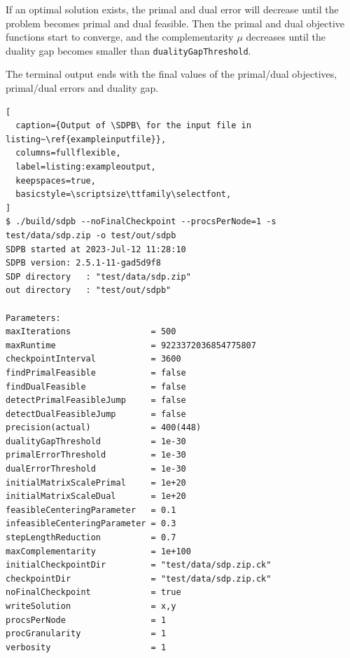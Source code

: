 \documentclass[12pt]{article}
\numberwithin{equation}{section}
\newcommand\SDPB{\texttt{SDPB}}
\begin{document}
If an optimal solution exists, the primal and dual error will decrease until the problem becomes primal and dual feasible.  Then the primal and dual objective functions start to converge, and the complementarity $\mu$ decreases until the duality gap becomes smaller than \texttt{dualityGapThreshold}.

The terminal output ends with the final values of the primal/dual objectives, primal/dual errors and duality gap.

\begin{lstlisting}[
  caption={Output of \SDPB\ for the input file in listing~\ref{exampleinputfile}},
  columns=fullflexible,
  label=listing:exampleoutput,
  keepspaces=true,
  basicstyle=\scriptsize\ttfamily\selectfont,
]
$ ./build/sdpb --noFinalCheckpoint --procsPerNode=1 -s test/data/sdp.zip -o test/out/sdpb
SDPB started at 2023-Jul-12 11:28:10
SDPB version: 2.5.1-11-gad5d9f8
SDP directory   : "test/data/sdp.zip"
out directory   : "test/out/sdpb"

Parameters:
maxIterations                = 500
maxRuntime                   = 9223372036854775807
checkpointInterval           = 3600
findPrimalFeasible           = false
findDualFeasible             = false
detectPrimalFeasibleJump     = false
detectDualFeasibleJump       = false
precision(actual)            = 400(448)
dualityGapThreshold          = 1e-30
primalErrorThreshold         = 1e-30
dualErrorThreshold           = 1e-30
initialMatrixScalePrimal     = 1e+20
initialMatrixScaleDual       = 1e+20
feasibleCenteringParameter   = 0.1
infeasibleCenteringParameter = 0.3
stepLengthReduction          = 0.7
maxComplementarity           = 1e+100
initialCheckpointDir         = "test/data/sdp.zip.ck"
checkpointDir                = "test/data/sdp.zip.ck"
noFinalCheckpoint            = true
writeSolution                = x,y
procsPerNode                 = 1
procGranularity              = 1
verbosity                    = 1



\end{lstlisting}
\end{document}
